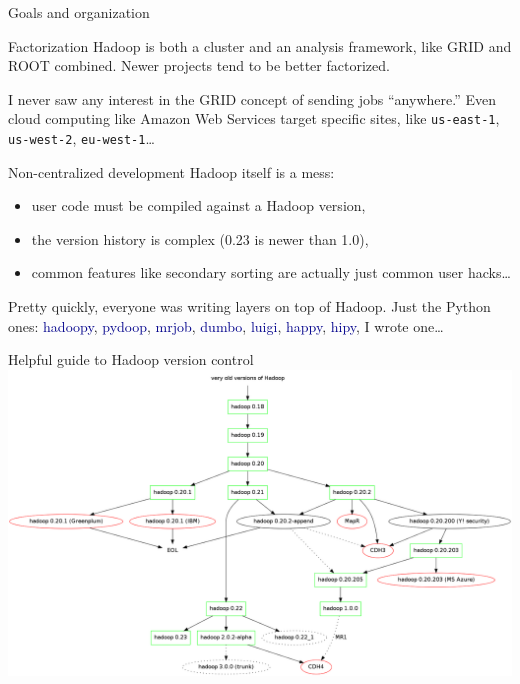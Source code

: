 \documentclass{beamer}
\begin{document}
\begin{frame}{Goals and organization}

\begin{block}{Factorization}
Hadoop is both a cluster and an analysis framework, like GRID and ROOT combined. Newer projects tend to be better factorized.

\vspace{0.5\baselineskip}
I never saw any interest in the GRID concept of sending jobs ``anywhere.'' Even cloud computing like Amazon Web Services target specific sites, like {\tt us-east-1}, {\tt us-west-2}, {\tt eu-west-1}\ldots
\end{block}

\begin{block}{Non-centralized development}
Hadoop itself is a mess:
\begin{itemize}
\item user code must be compiled against a Hadoop version,
\item the version history is complex (0.23 is newer than 1.0),
\item common features like secondary sorting are actually just common user hacks\ldots
\end{itemize}

\vspace{0.2 cm}
Pretty quickly, everyone was writing layers on top of Hadoop. Just the Python ones: \textcolor{darkblue}{hadoopy}, \textcolor{darkblue}{pydoop}, \textcolor{darkblue}{mrjob}, \textcolor{darkblue}{dumbo}, \textcolor{darkblue}{luigi}, \textcolor{darkblue}{happy}, \textcolor{darkblue}{hipy}, I wrote one\ldots
\end{block}
\end{frame}

\begin{frame}{Helpful guide to Hadoop version control}
\includegraphics[width=\linewidth]{hadoop_versions.png}
\end{frame}
\end{document}
